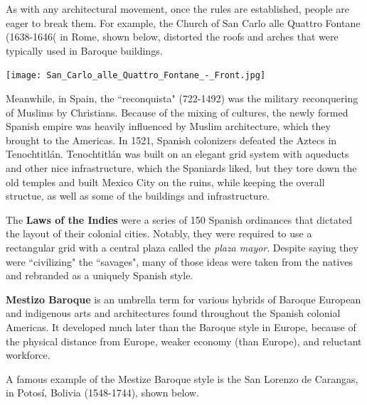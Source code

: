 \documentclass[class=article, crop=false]{standalone}
\begin{document}
\par
As with any architectural movement, once the rules are established, people are eager to break them. For example, the Church of San Carlo alle Quattro Fontane (1638-1646( in Rome, shown below, distorted the roofs and arches that were typically used in Baroque buildings.
\begin{center}
    \texttt{[image: San\_Carlo\_alle\_Quattro\_Fontane\_-\_Front.jpg]}
\end{center}
Meanwhile, in Spain, the ``reconquista" (722-1492) was the military reconquering of Muslims by Christians. Because of the mixing of cultures, the newly formed Spanish empire was heavily influenced by Muslim architecture, which they brought to the Americas. In 1521, Spanish colonizers defeated the Aztecs in Tenochtitlán. Tenochtitlán was built on an elegant grid system with aqueducts and other nice infrastructure, which the Spaniards liked, but they tore down the old temples and built Mexico City on the ruins, while keeping the overall structue, as well as some of the buildings and infrastructure.
\par
The \textbf{Laws of the Indies} were a series of 150 Spanish ordinances that dictated the layout of their colonial cities. Notably, they were required to use a rectangular grid with a central plaza called the \textit{plaza mayor}. Despite saying they were ``civilizing" the ``savages", many of those ideas were taken from the natives and rebranded as a uniquely Spanish style.
\par
\textbf{Mestizo Baroque} is an umbrella term for various hybrids of Baroque European and indigenous arts and architectures found throughout the Spanish colonial Americas. It developed much later than the Baroque style in Europe, because of the physical distance from Europe, weaker economy (than Europe), and reluctant workforce.
\par
A famous example of the Mestize Baroque style is the San Lorenzo de Carangas, in Potosí, Bolivia (1548-1744), shown below.
\end{document}
